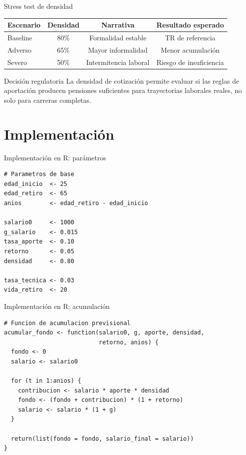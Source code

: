 \documentclass[aspectratio=169,11pt]{beamer}
\begin{document}
\begin{frame}{Stress test de densidad}
\begin{table}
\centering
\begin{tabular}{lccc}
\toprule
Escenario & Densidad & Narrativa & Resultado esperado \\
\midrule
Baseline & 80\% & Formalidad estable & TR de referencia \\
Adverso & 65\% & Mayor informalidad & Menor acumulación \\
Severo & 50\% & Intermitencia laboral & Riesgo de insuficiencia \\
\bottomrule
\end{tabular}
\end{table}

\begin{block}{Decisión regulatoria}
La densidad de cotización permite evaluar si las reglas de aportación producen pensiones suficientes para trayectorias laborales reales, no solo para carreras completas.
\end{block}
\end{frame}

\section{Implementación}

\begin{frame}[fragile]{Implementación en R: parámetros}
\begin{lstlisting}[style=Rstyle]
# Parametros de base
edad_inicio  <- 25
edad_retiro  <- 65
anios        <- edad_retiro - edad_inicio

salario0     <- 1000
g_salario    <- 0.015
tasa_aporte  <- 0.10
retorno      <- 0.05
densidad     <- 0.80

tasa_tecnica <- 0.03
vida_retiro  <- 20
\end{lstlisting}
\end{frame}

\begin{frame}[fragile]{Implementación en R: acumulación}
\begin{lstlisting}[style=Rstyle]
# Funcion de acumulacion previsional
acumular_fondo <- function(salario0, g, aporte, densidad,
                           retorno, anios) {
  fondo <- 0
  salario <- salario0

  for (t in 1:anios) {
    contribucion <- salario * aporte * densidad
    fondo <- (fondo + contribucion) * (1 + retorno)
    salario <- salario * (1 + g)
  }

  return(list(fondo = fondo, salario_final = salario))
}
\end{lstlisting}
\end{frame}
\end{document}
